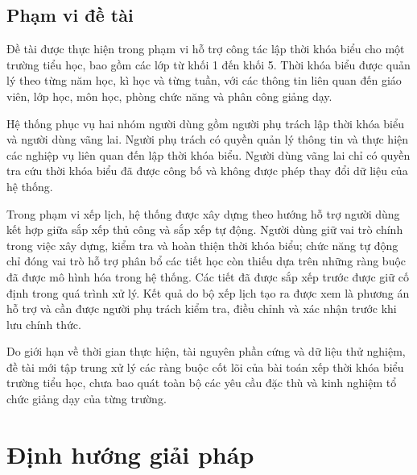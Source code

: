 \documentclass[../DoAn.tex]{subfiles}
\begin{document}
\subsection{Phạm vi đề tài}
\label{section:1.2.2}

Đề tài được thực hiện trong phạm vi hỗ trợ công tác lập thời khóa biểu cho một trường tiểu học, bao gồm các lớp từ khối 1 đến khối 5. Thời khóa biểu được quản lý theo từng năm học, kì học và từng tuần, với các thông tin liên quan đến giáo viên, lớp học, môn học, phòng chức năng và phân công giảng dạy.

Hệ thống phục vụ hai nhóm người dùng gồm người phụ trách lập thời khóa biểu và người dùng vãng lai. Người phụ trách có quyền quản lý thông tin và thực hiện các nghiệp vụ liên quan đến lập thời khóa biểu. Người dùng vãng lai chỉ có quyền tra cứu thời khóa biểu đã được công bố và không được phép thay đổi dữ liệu của hệ thống.

Trong phạm vi xếp lịch, hệ thống được xây dựng theo hướng hỗ trợ người dùng kết
hợp giữa sắp xếp thủ công và sắp xếp tự động. Người dùng giữ vai trò chính trong
việc xây dựng, kiểm tra và hoàn thiện thời khóa biểu; chức năng tự động chỉ đóng
vai trò hỗ trợ phân bổ các tiết học còn thiếu dựa trên những ràng buộc đã được mô
hình hóa trong hệ thống. Các tiết đã được sắp xếp trước được giữ cố định trong
quá trình xử lý. Kết quả do bộ xếp lịch tạo ra được xem là phương án hỗ trợ và
cần được người phụ trách kiểm tra, điều chỉnh và xác nhận trước khi lưu chính
thức.

Do giới hạn về thời gian thực hiện, tài nguyên phần cứng và dữ liệu thử nghiệm,
đề tài mới tập trung xử lý các ràng buộc cốt lõi của bài toán xếp thời khóa biểu
trường tiểu học, chưa bao quát toàn bộ các yêu cầu đặc thù và kinh nghiệm tổ
chức giảng dạy của từng trường.

\section{Định hướng giải pháp}
\label{section:1.3}
\end{document}
